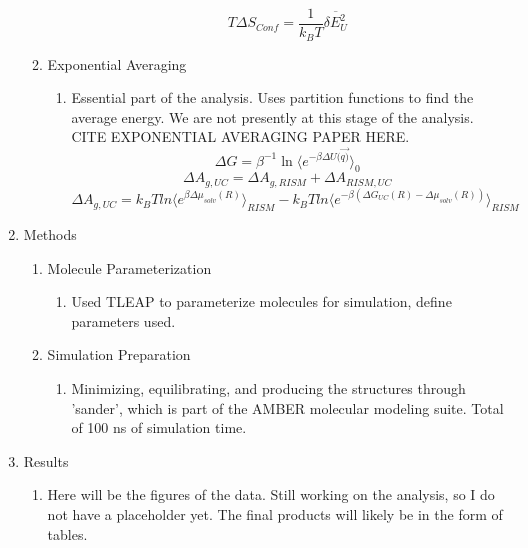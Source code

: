 \documentclass{article}
\begin{document}
\begin{enumerate}
\begin{enumerate}
\begin{enumerate}
			\begin{equation}
				T\Delta S_{Conf}=\frac{{1}}{k_{B}T}\overline{{\delta E_U^{2}}}
			\end{equation}
		\end{enumerate}
		\item Exponential Averaging
		\begin{enumerate}
			\item Essential part of the analysis. Uses partition functions to find the average energy. We are not presently at this stage of the analysis. CITE EXPONENTIAL AVERAGING PAPER HERE.
			\begin{equation}
				\Delta G=\beta^{-1}\ln\langle e^{-\beta\Delta U(\vec{q)}}\rangle_{0}
			\end{equation}
			\begin{equation}
				\Delta A_{g,UC} = \Delta A_{g,RISM} + \Delta A_{RISM,UC}
			\end{equation}
			\begin{equation}
				\Delta A_{g,UC} = k_B T ln\langle e^{\beta \Delta \mu_{solv} (R)} \rangle_{RISM} -k_B T ln\langle e^{-\beta (\Delta G_{UC} (R) - \Delta \mu_{solv} (R))} \rangle_{RISM}
			\end{equation}
		\end{enumerate}
	\end{enumerate}
	\item Methods
	\begin{enumerate}
		\item Molecule Parameterization
		\begin{enumerate}
			\item Used TLEAP to parameterize molecules for simulation, define parameters used.
		\end{enumerate}
		\item Simulation Preparation
		\begin{enumerate}
			\item Minimizing, equilibrating, and producing the structures through 'sander', which is part of the AMBER molecular modeling suite. Total of 100 ns of simulation time.
		\end{enumerate}
	\end{enumerate}
	\item Results
	\begin{enumerate}
		\item Here will be the figures of the data. Still working on the analysis, so I do not have a placeholder yet. The final products will likely be in the form of tables. 
	\end{enumerate}

\end{enumerate}
\end{document}
